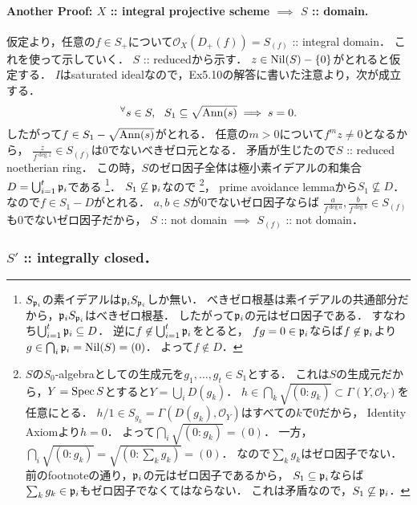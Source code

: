 \documentclass[a4paper]{jsarticle}
\newcommand{\shO}{\mathcal{O}}
\begin{document}
    \paragraph{Another Proof: $X$ :: integral projective scheme $\implies$ $S$ :: domain.}
    仮定より，任意の$f \in S_+$について$\shO_X(D_+(f))=S_{(f)}$ :: integral domain．
    これを使って示していく．
    $S$ :: reducedから示す．
    $z \in \operatorname{Nil}(S)-\{0\}$がとれると仮定する．
    $I$はsaturated idealなので，Ex5.10の解答に書いた注意より，次が成立する．
    \[ {}^{\forall} s \in S,~~ S_1 \subseteq \sqrt{\operatorname{Ann}(s)} \implies s=0. \]
    したがって$f \in S_1-\sqrt{\operatorname{Ann}(s)}$がとれる．
    任意の$m>0$について$f^mz \neq 0$となるから，
    $\frac{z}{f^{\deg z}} \in S_{(f)}$は$0$でないべきゼロ元となる．
    矛盾が生じたので$S$ :: reduced noetherian ring．
    この時，$S$のゼロ因子全体は極小素イデアルの和集合$D=\bigcup_{i=1}^t \mathfrak{p}_i$である
    \footnote
    {
        $S_{\mathfrak{p}_i}$の素イデアルは$\mathfrak{p}_iS_{\mathfrak{p}_i}$しか無い．
        べきゼロ根基は素イデアルの共通部分だから，$\mathfrak{p}_iS_{\mathfrak{p}_i}$はべきゼロ根基．
        したがって$\mathfrak{p}_i$の元はゼロ因子である．
        すなわち$\bigcup_{i=1}^t \mathfrak{p}_i \subseteq D$．
        逆に$f \not \in \bigcup_{i=1}^t \mathfrak{p}_i$をとると，
        $fg=0 \in \mathfrak{p}_i$ならば$f \not \in \mathfrak{p}_i$より$g \in \bigcap_{i} \mathfrak{p}_i=\operatorname{Nil}(S)=(0)$．
        よって$f \not \in D$．
    }．
    $S_1 \not \subseteq \mathfrak{p}_i$なので
    \footnote
    {
        $S$の$S_0$-algebraとしての生成元を$g_1,\dots,g_t \in S_1$とする．
        これは$S$の生成元だから，$Y=\operatorname{Spec} S$とすると$Y=\bigcup_i D(g_k)$．
        $h \in \bigcap_k \sqrt{(0:g_k)} \subset \Gamma(Y, \shO_Y)$を任意にとる．
        $h/1 \in S_{g_k}=\Gamma(D(g_k), \shO_Y)$はすべての$k$で$0$だから，
        Identity Axiomより$h=0$．
        よって$\bigcap_i \sqrt{(0:g_k)}=(0)$．
        一方，$\bigcap_i \sqrt{(0:g_k)}=\sqrt{(0:\sum_k g_k)}=(0)$．
        なので$\sum_k g_k$はゼロ因子でない．
        前のfootnoteの通り，$\mathfrak{p}_i$の元はゼロ因子であるから，
        $S_1 \subseteq \mathfrak{p}_i$ならば$\sum_k g_k \in \mathfrak{p}_i$もゼロ因子でなくてはならない．
        これは矛盾なので，$S_1 \not \subseteq \mathfrak{p}_i$．
    }，
    prime avoidance lemmaから$S_1 \not \subseteq D$．
    なので$f \in S_1-D$がとれる．
    $a,b \in S$が$0$でないゼロ因子ならば
    $\frac{a}{f^{\deg a}}, \frac{b}{f^{\deg b}} \in S_{(f)}$も$0$でないゼロ因子だから，
    $S$ :: not domain $\implies$ $S_{(f)}$ :: not domain．

    \subsubsection{$S'$ :: integrally closed．}
\end{document}
